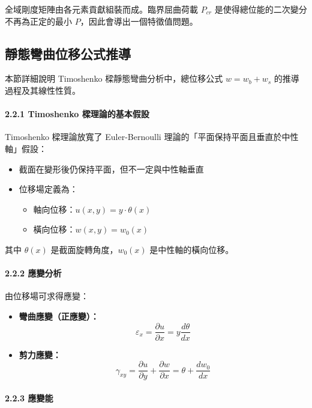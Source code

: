 \documentclass[UTF8, a4paper, 12pt]{ctexart}
\begin{document}
全域剛度矩陣由各元素貢獻組裝而成。臨界屈曲荷載 $P_{cr}$ 是使得總位能的二次變分不再為正定的最小 $P$，因此會導出一個特徵值問題。

\subsection{靜態彎曲位移公式推導}

本節詳細說明 Timoshenko 樑靜態彎曲分析中，總位移公式 $w = w_b + w_s$ 的推導過程及其線性性質。

\paragraph{2.2.1 Timoshenko 樑理論的基本假設}

Timoshenko 樑理論放寬了 Euler-Bernoulli 理論的「平面保持平面且垂直於中性軸」假設：

\begin{itemize}
  \item 截面在變形後仍保持平面，但不一定與中性軸垂直
  \item 位移場定義為：
  \begin{itemize}
    \item 軸向位移：$u(x, y) = y \cdot \theta(x)$
    \item 橫向位移：$w(x, y) = w_0(x)$
  \end{itemize}
\end{itemize}

其中 $\theta(x)$ 是截面旋轉角度，$w_0(x)$ 是中性軸的橫向位移。

\paragraph{2.2.2 應變分析}

由位移場可求得應變：

\begin{itemize}
  \item \textbf{彎曲應變（正應變）：}
  $$\varepsilon_x = \frac{\partial u}{\partial x} = y \frac{d\theta}{dx}$$
  
  \item \textbf{剪力應變：}
  $$\gamma_{xy} = \frac{\partial u}{\partial y} + \frac{\partial w}{\partial x} = \theta + \frac{dw_0}{dx}$$
\end{itemize}

\paragraph{2.2.3 應變能}
\end{document}
